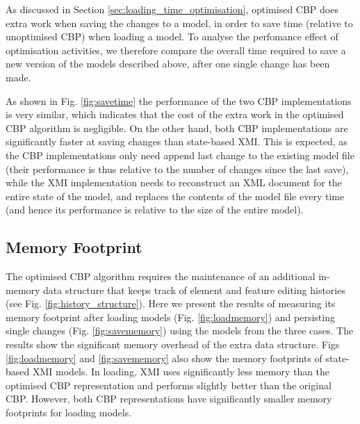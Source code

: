 \documentclass{llncs}
\begin{document}
    As discussed in Section \ref{sec:loading_time_optimisation}, optimised CBP does extra work when saving the changes to a model, in order to save time (relative to unoptimised CBP) when loading a model.  To analyse the perfomance effect of optimisation activities, we therefore compare the overall time required to save a new version of the models described above, after one single change has been made.
    
    As shown in Fig. \ref{fig:savetime} the performance of the two CBP implementations is very similar, which indicates that the cost of the extra work in the optimised CBP algorithm is negligible. On the other hand, both CBP implementations are significantly faster at saving changes than state-based XMI.  This is expected, as the CBP implementations only need append last change to the existing model file (their performance is thus relative to the number of changes since the last save), while the XMI implementation needs to reconstruct an XML document for the entire state of the model, and replaces the contents of the model file every time (and hence its performance is relative to the size of the entire model). 
    
    \subsection{Memory Footprint}
    \label{subsec:memory_consumption}
    
    The optimised CBP algorithm requires the maintenance of an additional in-memory data structure that keeps track of element and feature editing histories (see Fig. \ref{fig:history_structure}).  Here we present the results of measuring its memory footprint after loading models (Fig. \ref{fig:loadmemory}) and persisting single changes (Fig. \ref{fig:savememory}) using the models from the three cases. The results show the significant memory overhead of the extra data structure.   Figs \ref{fig:loadmemory} and \ref{fig:savememory}  also show the memory footprints of state-based XMI models. In loading, XMI uses significantly less memory than the optimised CBP representation and performs slightly better than the original CBP.  However, both CBP representations have significantly smaller memory  footprints for loading models.
    
\end{document}
